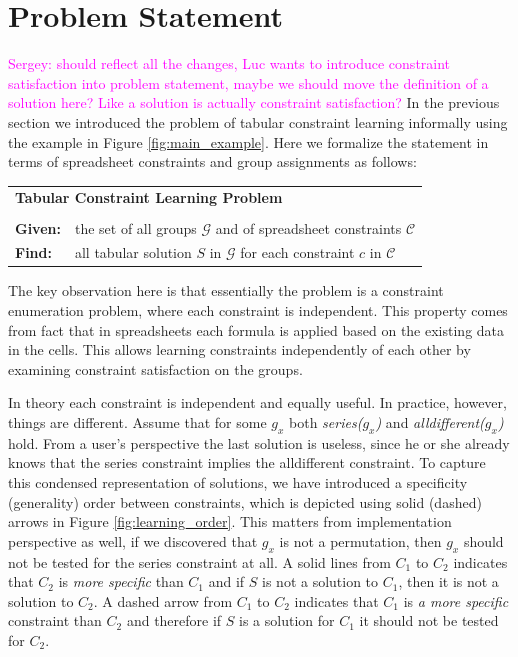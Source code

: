 \documentclass{ecai}
\newcommand{\sergey}[1]{\textcolor{magenta}{{\sc Sergey:} #1}\xspace}
\newcommand{\constraints}{\ensuremath{\mathcal{C}}\xspace}
\newcommand{\groups}{\ensuremath{\mathcal{G}}\xspace}
\begin{document}
\section{Problem Statement}
\sergey{should reflect all the changes, Luc wants to introduce constraint satisfaction into problem statement, maybe we should move the definition of a solution here? Like a solution is actually constraint satisfaction?}
In the previous section we introduced the problem of tabular constraint learning informally using the example in Figure \ref{fig:main_example}. Here we formalize the statement in terms of spreadsheet constraints and group assignments as follows: 

\begin{minipage}[c]{14em}
  \vspace{5pt}
  \begin{tabular}{ll}
    \multicolumn{2}{l}{{\textbf{Tabular Constraint Learning Problem}}}\\
    \vspace{-4pt}
    &\\
    \textbf{Given:}& the set of all groups $\groups$ and of spreadsheet constraints $\constraints$\\
    \textbf{Find:}&  all tabular solution $S$ in \groups for each constraint $c$ in \constraints \\
  \end{tabular}
  \vspace{6pt}
\end{minipage}

  The key observation here is that essentially the problem is a constraint enumeration problem, where each constraint is independent. This property comes from fact that in spreadsheets each formula is applied based on the existing data in the cells. This allows learning constraints independently of each other by examining constraint satisfaction on the groups.


  In theory each constraint is independent and equally useful. In practice, however, things are different. Assume that for some $g_x$ both \textit{series($g_x$)} and \textit{alldifferent($g_x$)} hold. From a user's perspective the last solution is useless, since he or she already knows that the series constraint implies the alldifferent constraint. To capture this condensed representation \cite{condensed} of solutions, we have introduced a specificity (generality) order between constraints, which is depicted using solid (dashed) arrows in Figure \ref{fig:learning_order}. This matters from implementation perspective as well, if we discovered that $g_x$ is not a permutation, then $g_x$ should not be tested for the series constraint at all. A solid lines from $C_1$ to $C_2$ indicates that $C_2$ is \textit{more specific} than $C_1$ and if $S$ is not a solution to $C_1$, then it is not a solution to $C_2$. A dashed arrow from $C_1$ to $C_2$ indicates that $C_1$ is \textit{a more specific} constraint than $C_2$ and therefore if $S$ is a solution for $C_1$ it should not be tested for $C_2$.
\end{document}
